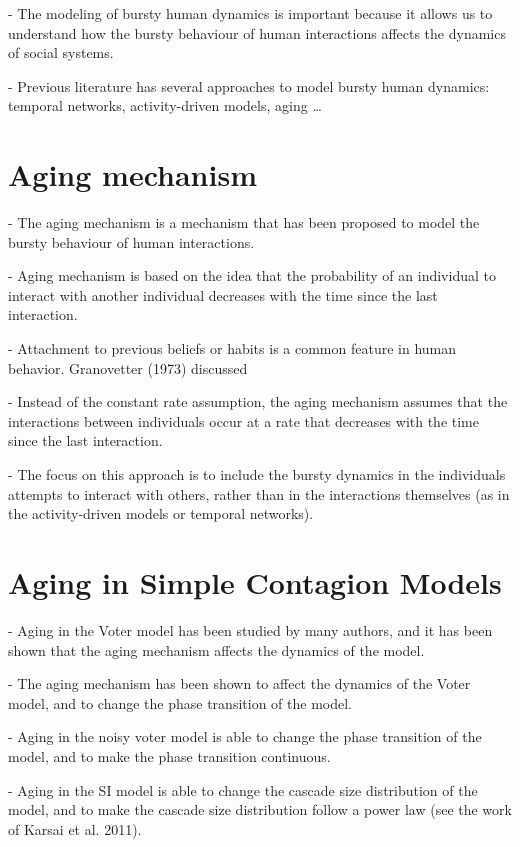 - The modeling of bursty human dynamics is important because it allows us to understand how the bursty behaviour of human interactions affects the dynamics of social systems.

- Previous literature has several approaches to model bursty human dynamics: temporal networks, activity-driven models, aging \dots

\section{\label{sec:Aging mechanism} Aging mechanism}

- The aging mechanism is a mechanism that has been proposed to model the bursty behaviour of human interactions.

- Aging mechanism is based on the idea that the probability of an individual to interact with another individual decreases with the time since the last interaction.

- Attachment to previous beliefs or habits is a common feature in human behavior. Granovetter (1973) discussed 

- Instead of the constant rate assumption, the aging mechanism assumes that the interactions between individuals occur at a rate that decreases with the time since the last interaction.

- The focus on this approach is to include the bursty dynamics in the individuals attempts to interact with others, rather than in the interactions themselves (as in the activity-driven models or temporal networks).

\section{\label{sec:Aging in Simple Contagion Models} Aging in Simple Contagion Models}

- Aging in the Voter model has been studied by many authors, and it has been shown that the aging mechanism affects the dynamics of the model.

- The aging mechanism has been shown to affect the dynamics of the Voter model, and to change the phase transition of the model.

- Aging in the noisy voter model is able to change the phase transition of the model, and to make the phase transition continuous.

- Aging in the SI model is able to change the cascade size distribution of the model, and to make the cascade size distribution follow a power law (see the work of Karsai et al. 2011).